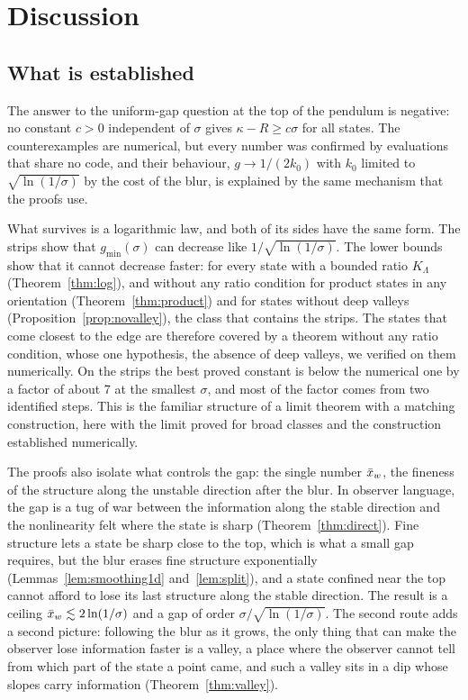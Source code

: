 \section{Discussion}
\label{sec:discussion}

\subsection{What is established}

The answer to the uniform-gap question at the top of the pendulum is negative: no constant $c > 0$ independent of $\sigma$ gives $\kappa - R \geq c\sigma$ for all states. The counterexamples are numerical, but every number was confirmed by evaluations that share no code, and their behaviour, $g \to 1/(2k_0)$ with $k_0$ limited to $\sqrt{\ln(1/\sigma)}$ by the cost of the blur, is explained by the same mechanism that the proofs use.

What survives is a logarithmic law, and both of its sides have the same form. The strips show that $g_{\min}(\sigma)$ can decrease like $1/\sqrt{\ln(1/\sigma)}$. The lower bounds show that it cannot decrease faster: for every state with a bounded ratio $K_\Lambda$ (Theorem~\ref{thm:log}), and without any ratio condition for product states in any orientation (Theorem~\ref{thm:product}) and for states without deep valleys (Proposition~\ref{prop:novalley}), the class that contains the strips. The states that come closest to the edge are therefore covered by a theorem without any ratio condition, whose one hypothesis, the absence of deep valleys, we verified on them numerically. On the strips the best proved constant is below the numerical one by a factor of about 7 at the smallest $\sigma$, and most of the factor comes from two identified steps. This is the familiar structure of a limit theorem with a matching construction, here with the limit proved for broad classes and the construction established numerically.

The proofs also isolate what controls the gap: the single number $\bar{x}_w$, the fineness of the structure along the unstable direction after the blur. In observer language, the gap is a tug of war between the information along the stable direction and the nonlinearity felt where the state is sharp (Theorem~\ref{thm:direct}). Fine structure lets a state be sharp close to the top, which is what a small gap requires, but the blur erases fine structure exponentially (Lemmas~\ref{lem:smoothing1d} and~\ref{lem:split}), and a state confined near the top cannot afford to lose its last structure along the stable direction. The result is a ceiling $\bar{x}_w \lesssim 2\ln(1/\sigma)$ and a gap of order $\sigma/\sqrt{\ln(1/\sigma)}$. The second route adds a second picture: following the blur as it grows, the only thing that can make the observer lose information faster is a valley, a place where the observer cannot tell from which part of the state a point came, and such a valley sits in a dip whose slopes carry information (Theorem~\ref{thm:valley}).

